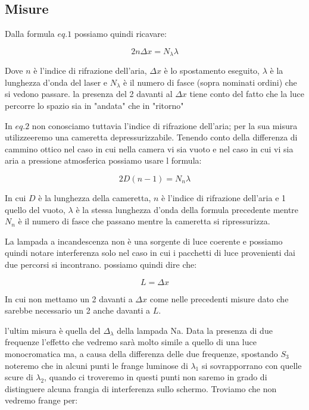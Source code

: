 \documentclass{article}
\begin{document}
\subsection{Misure}
Dalla formula $eq.1$ possiamo quindi ricavare:

\begin{equation} 
2 n \Delta{x} = N_\lambda \lambda 
\end{equation}

Dove $n$ è l'indice di rifrazione dell'aria, $\Delta{x}$ è lo spostamento eseguito, $\lambda$ è la lunghezza d'onda del laser e $N_\lambda$ è il numero di fasce (sopra nominati ordini) che si vedono passare. la presenza del 2 davanti al $\Delta{x}$ tiene conto del fatto che la luce percorre lo spazio sia in "andata" che in "ritorno"

In $eq.2$ non conosciamo tuttavia l'indice di rifrazione dell'aria; per la sua misura utilizzeeremo una cameretta depressurizzabile. Tenendo conto della differenza di cammino ottico nel caso in cui nella camera vi sia vuoto e nel caso in cui vi sia aria a pressione atmosferica possiamo usare l formula:

\begin{equation}
 2D (n {-} 1) = N_n \lambda
\end{equation}

In cui $D$ è la lunghezza della cameretta, $n$ è l'indice di rifrazione dell'aria e 1 quello del vuoto, $\lambda$ è la stessa lunghezza d'onda della formula precedente mentre $N_n$ è il numero di fasce  che passano mentre la cameretta si ripressurizza.

La lampada a incandescenza non è una sorgente di luce coerente e possiamo quindi notare interferenza solo nel caso in cui i pacchetti di luce provenienti dai due percorsi si incontrano. possiamo quindi dire che:

\begin{equation} 
L = \Delta{x} 
\end{equation}

In cui non mettamo un 2 davanti a $\Delta{x}$ come nelle precedenti misure dato che sarebbe necessario un 2 anche davanti a $L$.

l'ultim misura è quella del $\Delta_\lambda$ della lampada Na. Data la presenza di due frequenze l'effetto che vedremo sarà molto simile a quello di una luce monocromatica ma, a causa della differenza delle due frequenze, spostando $S_3$ noteremo che in alcuni punti le frange luminose di $\lambda_1$ si sovrapporrano con quelle scure di $\lambda_2$, quando ci troveremo in questi punti non saremo in grado di distinguere alcuna frangia di interferenza sullo schermo. Troviamo che non vedremo frange per:
\end{document}
